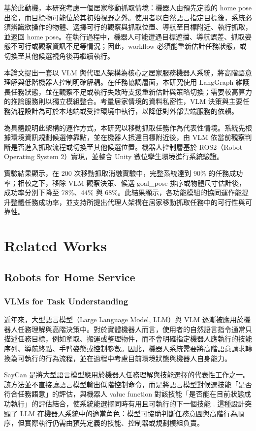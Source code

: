 \documentclass[12pt,a4paper]{article}
\begin{document}
基於此動機，本研究考慮一個居家移動抓取情境：機器人由預先定義的 home pose 出發，而目標物可能位於其初始視野之外。使用者以自然語言指定目標後，系統必須辨識欲操作的物體、選擇可行的觀察與抓取位置、導航至目標附近、執行抓取，並返回 home pose。在執行過程中，機器人可能遭遇目標遮擋、導航誤差、抓取姿態不可行或觀察資訊不足等情況；因此，workflow 必須能重新估計任務狀態，或切換至其他候選視角後再繼續執行。

本論文提出一套以 VLM 與代理人架構為核心之居家服務機器人系統，將高階語意理解與低階機器人控制明確解耦。在任務協調層面，本研究使用 LangGraph 維護長任務狀態，並在觀察不足或執行失敗時支援重新估計與策略切換；需要較高算力的推論服務則以獨立模組整合。考量居家情境的資料私密性，VLM 決策與主要任務流程設計為可於本地端或受控環境中執行，以降低對外部雲端服務的依賴。

為具體說明此架構的運作方式，本研究以移動抓取任務作為代表性情境。系統先根據環境資訊規劃候選停靠點，並在機器人抵達目標附近後，由 VLM 依當前觀察判斷是否進入抓取流程或切換至其他候選位置。機器人控制層基於 ROS2（Robot Operating System 2）實現，並整合 Unity 數位孿生環境進行系統驗證。

實驗結果顯示，在 $200$ 次移動抓取消融實驗中，完整系統達到 $90\%$ 的任務成功率；相較之下，移除 VLM 觀察決策、候選 goal\_pose 排序或物體尺寸估計後，成功率分別下降至 $78\%$、$44\%$ 與 $68\%$。此結果顯示，各功能模組的協同運作能提升整體任務成功率，並支持所提出代理人架構在居家移動抓取任務中的可行性與可靠性。

\section{Related Works}

\subsection{Robots for Home Service}

\subsubsection{VLMs for Task Understanding}

近年來，大型語言模型（Large Language Model, LLM）與 VLM 逐漸被應用於機器人任務理解與高階決策中。對於實體機器人而言，使用者的自然語言指令通常只描述任務目標，例如拿取、搬運或整理物件，而不會明確指定機器人應執行的技能序列、導航終點、手臂姿態或控制參數。因此，機器人系統需要將高階語意請求轉換為可執行的行為流程，並在過程中考慮目前環境狀態與機器人自身能力。

SayCan 是將大型語言模型應用於機器人任務理解與技能選擇的代表性工作之一。該方法並不直接讓語言模型輸出低階控制命令，而是將語言模型對候選技能「是否符合任務語意」的評估，與機器人 value function 對該技能「是否能在目前狀態成功執行」的評估結合，使系統能選擇同時有用且可執行的下一個技能 \cite{ahn2022saycan}. 這種設計突顯了 LLM 在機器人系統中的適當角色：模型可協助判斷任務意圖與高階行為順序，但實際執行仍需由預先定義的技能、控制器或規劃模組負責。
\end{document}
